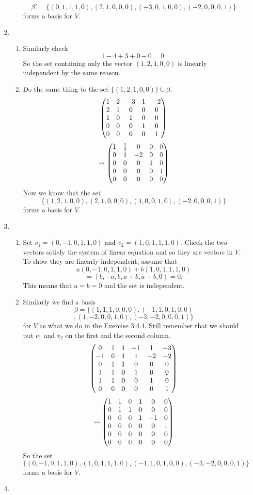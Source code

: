\begin{enumerate}
\begin{enumerate}
\[\beta'=\{(0,1,1,1,0),(2,1,0,0,0),(-3,0,1,0,0),(-2,0,0,0,1)\}\] forms a basis for $V$.
\end{enumerate}
\item \begin{enumerate}
\item Similarly check 
\[1-4+3+0-0=0.\]
So the set containing only the vector $(1,2,1,0,0)$ is linearly independent by the same reason.
\item Do the same thing to the set $\{(1,2,1,0,0)\}\cup \beta $.
\[\begin{pmatrix}1 & 2 & -3 & 1 & -2\cr 2 & 1 & 0 & 0 & 0\cr 1 & 0 & 1 & 0 & 0\cr 0 & 0 & 0 & 1 & 0\cr 0 & 0 & 0 & 0 & 1\end{pmatrix}\]
\[\rightsquigarrow \begin{pmatrix}1 & \frac{1}{2} & 0 & 0 & 0\cr 0 & 1 & -2 & 0 & 0\cr 0 & 0 & 0 & 1 & 0\cr 0 & 0 & 0 & 0 & 1\cr 0 & 0 & 0 & 0 & 0\end{pmatrix}\]
Now we know that the set 
\[\{(1,2,1,0,0),(2,1,0,0,0),(1,0,0,1,0),(-2,0,0,0,1)\}\] forms a basis for $V$.
\end{enumerate}
\item \begin{enumerate}
\item Set $v_1=(0,-1,0,1,1,0)$ and $v_2=(1,0,1,1,1,0)$. Check the two vectors satisfy the system of linear equation and so they are vectors in $V$. To show they are linearly independent, assume that 
\[a(0,-1,0,1,1,0)+b(1,0,1,1,1,0)\]
\[=(b,-a,b,a+b,a+b,0)=0.\]
This means that $a=b=0$ and the set is independent.
\item Similarly we find a basis 
\[\beta=\{(1,1,1,0,0,0),(-1,1,0,1,0,0)\]
\[,(1,-2,0,0,1,0),(-3,-2,0,0,0,1)\}\]for $V$ as what we do in the Exercise 3.4.4. Still remember that we should put $v_1$ and $v_2$ on the first and the second column. 
\[\begin{pmatrix}0 & 1 & 1 & -1 & 1 & -3\cr -1 & 0 & 1 & 1 & -2 & -2\cr 0 & 1 & 1 & 0 & 0 & 0\cr 1 & 1 & 0 & 1 & 0 & 0\cr 1 & 1 & 0 & 0 & 1 & 0\cr 0 & 0 & 0 & 0 & 0 & 1\end{pmatrix}\]
\[\rightsquigarrow \begin{pmatrix}1 & 1 & 0 & 1 & 0 & 0\cr 0 & 1 & 1 & 0 & 0 & 0\cr 0 & 0 & 0 & 1 & -1 & 0\cr 0 & 0 & 0 & 0 & 0 & 1\cr 0 & 0 & 0 & 0 & 0 & 0\cr 0 & 0 & 0 & 0 & 0 & 0\end{pmatrix}\]
So the set 
\[\{(0,-1,0,1,1,0),(1,0,1,1,1,0),(-1,1,0,1,0,0),(-3,-2,0,0,0,1)\}\]
forms a basis for $V$.
\end{enumerate}
\item \begin{enumerate}

\end{enumerate}
\end{enumerate}
